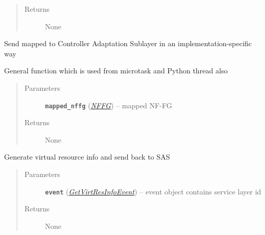 \documentclass[letterpaper,10pt,english]{sphinxmanual}
\begin{document}
\begin{fulllineitems}
\begin{fulllineitems}
\begin{quote}
\begin{description}
\item[{Returns}] \leavevmode
None

\end{description}\end{quote}

\end{fulllineitems}


\begin{fulllineitems}
\label{orchest/ros_API:escape.orchest.ros_API.ResourceOrchestrationAPI._install_NFFG}
Send mapped {\hyperref[util/nffg:escape.util.nffg.NFFG]{\emph{}}} to Controller Adaptation
Sublayer in an implementation-specific way

General function which is used from microtask and Python thread also
\begin{quote}\begin{description}
\item[{Parameters}] \leavevmode
\textbf{\texttt{mapped\_nffg}} ({\hyperref[util/nffg:escape.util.nffg.NFFG]{\emph{\emph{NFFG}}}}) -- mapped NF-FG

\item[{Returns}] \leavevmode
None

\end{description}\end{quote}

\end{fulllineitems}


\begin{fulllineitems}
\label{orchest/ros_API:escape.orchest.ros_API.ResourceOrchestrationAPI._handle_GetVirtResInfoEvent}
Generate virtual resource info and send back to SAS
\begin{quote}\begin{description}
\item[{Parameters}] \leavevmode
\textbf{\texttt{event}} ({\hyperref[service/sas_API:escape.service.sas_API.GetVirtResInfoEvent]{\emph{\emph{GetVirtResInfoEvent}}}}) -- event object contains service layer id

\item[{Returns}] \leavevmode
None


\end{description}
\end{quote}
\end{fulllineitems}
\end{fulllineitems}
\end{document}
